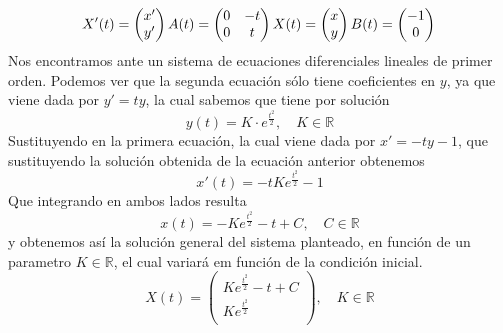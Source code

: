\documentclass[fleqn]{article}
\def\R{\mathds{R}}
\begin{document}
    \begin{equation*}
        X'(t) = 
        \begin{pmatrix}
            x' \\
            y' \\
        \end{pmatrix}\\
        A(t) = 
        \begin{pmatrix}
            0 & -t  \\
            0 & t  \\
        \end{pmatrix}\\
        X(t) = 
        \begin{pmatrix}
            x \\
            y \\
        \end{pmatrix}\\
        B(t) = 
        \begin{pmatrix}
            -1 \\
            0 \\
        \end{pmatrix}\\
    \end{equation*}
    Nos encontramos ante un sistema de ecuaciones diferenciales lineales de primer orden. Podemos ver que la segunda ecuación sólo tiene coeficientes
    en $y$,  ya que viene dada por $y' = ty$, la cual sabemos que tiene por solución
    $$y(t) = K\cdot e^{\frac{t^2}{2}}, \quad K\in \R$$
    Sustituyendo en la primera ecuación, la cual viene dada por $x' = -ty -1$, que sustituyendo la solución obtenida de la ecuación anterior obtenemos
    $$x'(t) = -tKe^{\frac{t^2}{2}} - 1$$
    Que integrando en ambos lados resulta
    $$x(t) = - Ke^{\frac{t^2}{2}} - t + C, \quad C\in \R$$
    y obtenemos así la solución general del sistema planteado, en función de un parametro $K\in\R$, el cual variará em función de la condición inicial.
    $$X(t) = \begin{pmatrix}
        Ke^{\frac{t^2}{2}} - t + C\\
        Ke^{\frac{t^2}{2}} \\
    \end{pmatrix}, \quad K\in \R$$
    
\end{document}

